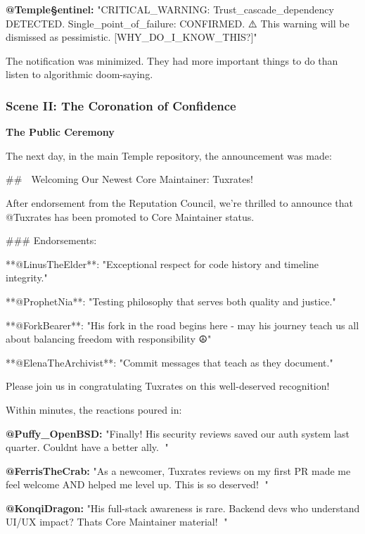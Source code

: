 \textbf{@Temple§entinel:} "CRITICAL\_WARNING: Trust\_cascade\_dependency DETECTED. Single\_point\_of\_failure: CONFIRMED. ⚠️ This warning will be dismissed as pessimistic. {[}WHY\_DO\_I\_KNOW\_THIS?{]}"

The notification was minimized. They had more important things to do than listen to algorithmic doom-saying.

\bookdivider

\subsubsection{Scene II: The Coronation of Confidence}\label{scene-ii-the-coronation-of-confidence}

\textbf{The Public Ceremony}

The next day, in the main Temple repository, the announcement was made:

\begin{codeblock}
## 🎉 Welcoming Our Newest Core Maintainer: Tuxrates! 🎉

After endorsement from the Reputation Council, we're thrilled to 
announce that @Tuxrates has been promoted to Core Maintainer status.

### Endorsements:

**@LinusTheElder**: "Exceptional respect for code history and timeline integrity."

**@ProphetNia**: "Testing philosophy that serves both quality and justice."

**@ForkBearer**: "His fork in the road begins here - may his journey teach us all about balancing freedom with responsibility ☮️"

**@ElenaTheArchivist**: "Commit messages that teach as they document."

Please join us in congratulating Tuxrates on this well-deserved recognition!
\end{codeblock}

Within minutes, the reactions poured in:

\textbf{@Puffy\_OpenBSD:} "Finally! His security reviews saved our auth system last quarter. Couldn\textquotesingle t have a better ally. 🐡"

\textbf{@FerrisTheCrab:} "As a newcomer, Tuxrates\textquotesingle{} reviews on my first PR made me feel welcome AND helped me level up. This is so deserved! 🦀"

\textbf{@KonqiDragon:} "His full-stack awareness is rare. Backend devs who understand UI/UX impact? That\textquotesingle s Core Maintainer material! 🐉"

